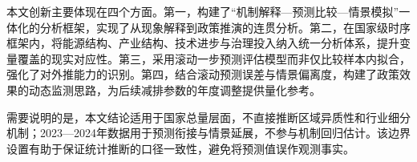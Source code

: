 本文创新主要体现在四个方面。第一，构建了“机制解释—预测比较—情景模拟”一体化的分析框架，实现了从现象解释到政策推演的连贯分析。第二，在国家级时序框架内，将能源结构、产业结构、技术进步与治理投入纳入统一分析体系，提升变量覆盖的现实对应性。第三，采用滚动一步预测评估模型而非仅比较样本内拟合，强化了对外推能力的识别。第四，结合滚动预测误差与情景偏离度，构建了政策效果的动态监测思路，为后续减排参数的年度调整提供量化参考。

需要说明的是，本文结论适用于国家总量层面，不直接推断区域异质性和行业细分机制；2023—2024年数据用于预测衔接与情景延展，不参与机制回归估计。该边界设置有助于保证统计推断的口径一致性，避免将预测值误作观测事实。
